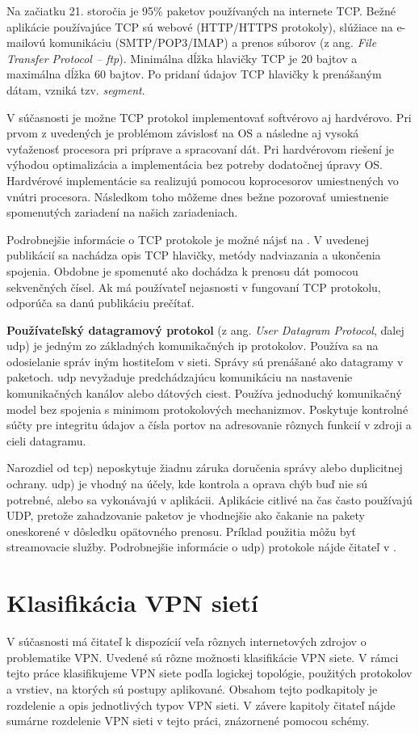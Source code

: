 Na začiatku 21. storočia je 95\% paketov používaných na internete TCP. Bežné aplikácie používajúce TCP sú webové (HTTP/HTTPS protokoly), slúžiace na e-mailovú komunikáciu (SMTP/POP3/IMAP) a prenos súborov (z ang. \textit{File Transfer Protocol -- \acrshort{ftp}}). Minimálna dĺžka hlavičky TCP je 20 bajtov a maximálna dĺžka 60 bajtov. Po pridaní údajov TCP hlavičky k prenášaným dátam, vzniká tzv. \textit{segment}.

V súčasnosti je možne TCP protokol implementovať softvérovo aj hardvérovo. Pri prvom z uvedených je problémom závislosť na OS a následne aj vysoká vyťaženosť procesora pri príprave a spracovaní dát. Pri hardvérovom riešení je výhodou optimalizácia a implementácia bez potreby dodatočnej úpravy OS. Hardvérové implementácie sa realizujú pomocou koprocesorov umiestnených vo vnútri procesora. Následkom toho môžeme dnes bežne pozorovať umiestnenie spomenutých zariadení na našich zariadeniach.

Podrobnejšie informácie o TCP protokole je možné nájsť na \cite{tcp2}. V uvedenej publikácií sa nachádza opis TCP hlavičky, metódy nadviazania a ukončenia spojenia. Obdobne je spomenuté ako dochádza k prenosu dát pomocou sekvenčných čísel. Ak má používateľ nejasnosti v fungovaní TCP protokolu, odporúča sa danú publikáciu prečítať.

\textbf{Používateľský datagramový protokol} (z ang. \textit{User Datagram Protocol}, ďalej \acrshort{udp}) je jedným zo základných komunikačných \acrshort{ip} protokolov. Používa sa na odosielanie správ iným hostiteľom v sieti. Správy sú prenášané ako datagramy v paketoch. \acrshort{udp} nevyžaduje predchádzajúcu komunikáciu na nastavenie komunikačných kanálov alebo dátových ciest. Používa jednoduchý komunikačný model bez spojenia s minimom protokolových mechanizmov. Poskytuje kontrolné súčty pre integritu údajov a čísla portov na adresovanie rôznych funkcií v zdroji a cieli datagramu. 

Narozdiel od \acrshort{tcp}) neposkytuje žiadnu záruka doručenia správy alebo duplicitnej ochrany. 
\acrshort{udp}) je vhodný na účely, kde kontrola a oprava chýb buď nie sú potrebné, alebo sa vykonávajú v aplikácii. Aplikácie citlivé na čas často používajú UDP, pretože zahadzovanie paketov je vhodnejšie ako čakanie na pakety oneskorené v dôsledku opätovného prenosu. Príklad použitia môžu byť streamovacie služby. 
Podrobnejšie informácie o \acrshort{udp}) protokole nájde čitateľ v \cite{udp}.

\section{Klasifikácia VPN sietí}
V súčasnosti má čitateľ k dispozícií veľa rôznych internetových zdrojov o problematike VPN. Uvedené sú rôzne možnosti klasifikácie VPN siete. V rámci tejto práce klasifikujeme VPN siete podľa logickej topológie, použitých protokolov a vrstiev, na ktorých sú postupy aplikované. Obsahom tejto podkapitoly je rozdelenie a opis jednotlivých typov VPN sieti. V závere kapitoly čitateľ nájde sumárne rozdelenie VPN sieti v tejto práci, znázornené pomocou schémy.  
